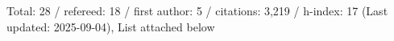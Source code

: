 Total: 28 / refereed: 18 / first author: 5 / citations: 3,219 / h-index: 17 (Last updated: 2025-09-04), List attached below